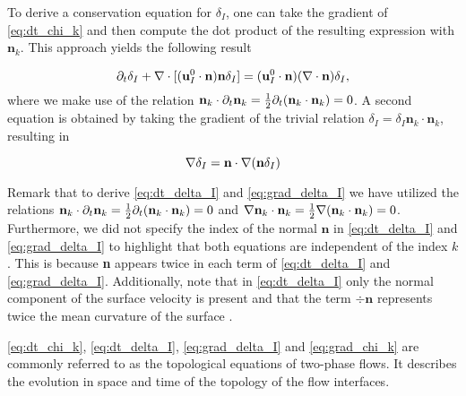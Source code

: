 To derive a conservation equation for $\delta_I$, one can take the gradient of \ref{eq:dt_chi_k} and then compute the dot product of the resulting expression with $\textbf{n}_k$. This approach yields the following result \citep{lhuillier2000bilan,junqua2003,orlando2023evolution}

\begin{equation}
    \partial_t \delta_I
    + \mathbf{\nabla}\cdot [(\textbf{u}_I^0\cdot \textbf{n}) \textbf{n}\delta_I ]
    = (\textbf{u}_I^0 \cdot \textbf{n})(\mathbf{\nabla}\cdot\textbf{n}) \delta_I ,
    \label{eq:dt_delta_I}
\end{equation} 
where we make use of the relation $\textbf{n}_k\cdot \partial_t\textbf{n}_k= \frac{1}{2}\partial_t(\textbf{n}_k\cdot \textbf{n}_k) = 0$. A second equation is obtained by taking the gradient of the trivial relation $\delta_I = \delta_I \textbf{n}_k\cdot \textbf{n}_k$, resulting in


\begin{equation}
    \mathbf{\nabla}\delta_I 
    = \textbf{n}\cdot  \mathbf{\nabla} (\textbf{n} \delta_I) 
    \label{eq:grad_delta_I}
\end{equation}

Remark that to derive \ref{eq:dt_delta_I} and \ref{eq:grad_delta_I} we have utilized the relations $\textbf{n}_k\cdot \partial_t\textbf{n}_k= \frac{1}{2}\partial_t(\textbf{n}_k\cdot \textbf{n}_k) = 0$ and $\mathbf{\nabla} \textbf{n}_k \cdot \textbf{n}_k =\frac{1}{2} \mathbf{\nabla}(\textbf{n}_k\cdot \textbf{n}_k) = 0$. 
Furthermore, we did not specify the index of the normal $\textbf{n}$ in \ref{eq:dt_delta_I} and \ref{eq:grad_delta_I} to highlight that both equations are independent of the index $k$. 
This is because \textbf{n} appears twice in each term of \ref{eq:dt_delta_I} and \ref{eq:grad_delta_I}.
Additionally, note that in \ref{eq:dt_delta_I} only the normal component of the surface velocity is present and that the term $\div \textbf{n}$ represents twice the mean curvature of the surface \citep{aris2012vectors}. 

\ref{eq:dt_chi_k}, \ref{eq:dt_delta_I}, \ref{eq:grad_delta_I} and \ref{eq:grad_chi_k} are commonly referred to as the topological equations of two-phase flows.
It describes the evolution in space and time of the topology of the flow interfaces.

